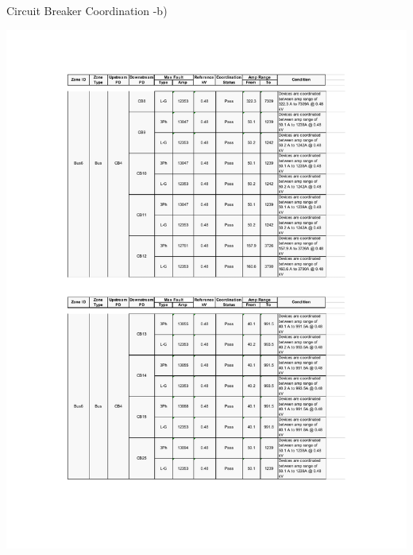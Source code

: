 \begin{table}[]
	\caption{Circuit Breaker Coordination -b)}
	\label{ch04_elecaudit_protectioncoordination03b}
	\includegraphics[width=\textwidth]{tables/ch04_elecaudit_protectioncoordination03b.pdf}	
\end{table}

